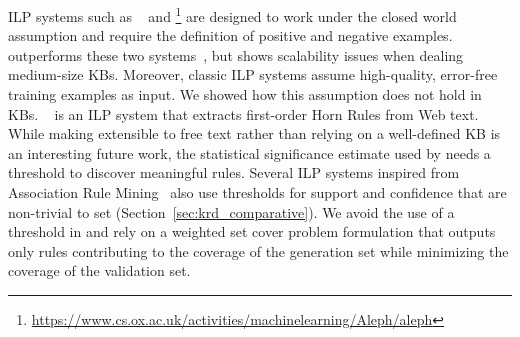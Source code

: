 

ILP systems such as ~\cite{dehaspe1999discovery} and \footnote{\url{https://www.cs.ox.ac.uk/activities/machinelearning/Aleph/aleph}} are designed to work under the closed world assumption and require the definition of positive and negative examples. \amie outperforms these two systems~\cite{galarraga2015fast}, but shows scalability issues when dealing medium-size KBs. Moreover, %
classic ILP systems assume high-quality, error-free training examples as input. 
We showed how this assumption does not hold in KBs. ~\cite{schoenmackers2010learning} is an ILP system that extracts first-order Horn Rules 
from Web text. While making \krd extensible to free text rather than relying on a well-defined KB is an interesting future work, 
the statistical significance estimate used by 
 needs a threshold to discover meaningful rules. Several ILP systems inspired from Association Rule Mining~\cite{agrawal1993mining} also use thresholds for support and confidence that are non-trivial to set (Section~\ref{sec:krd_comparative}). We avoid the use of a threshold in \krd and rely on a weighted set cover problem formulation that outputs only rules contributing to the coverage of the generation set while minimizing the coverage of the validation set.

